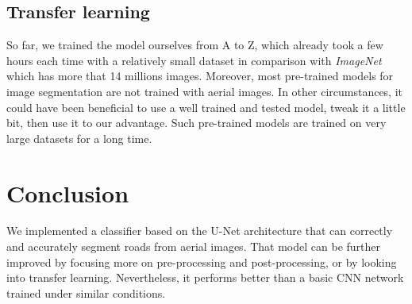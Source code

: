 \documentclass[10pt,conference,compsocconf]{IEEEtran}
\begin{document}
\subsection{Transfer learning}

So far, we trained the model ourselves from A to Z, which already took a few hours each time with a relatively small dataset in comparison with \emph{ImageNet} which has more that 14 millions images. Moreover, most pre-trained models for image segmentation are not trained with aerial images. In other circumstances, it could have been beneficial to use a well trained and tested model, tweak it a little bit, then use it to our advantage. Such pre-trained models are trained on very large datasets for a long time.

\section{Conclusion}

We implemented a classifier based on the U-Net architecture that can correctly and accurately segment roads from aerial images. That model can be further improved by focusing more on pre-processing and post-processing, or by looking into transfer learning. Nevertheless, it performs better than a basic CNN network trained under similar conditions.

\clearpage




\listoftodos



\nocite{*}
\end{document}
